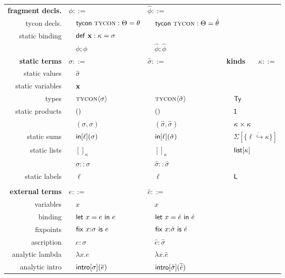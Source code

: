 \documentclass[10pt,preprint]{sigplanconf}
\begin{document}
{\begin{figure*}[t]
\begin{tabular}{r l l l}
\textbf{fragment decls.} & $\phi ::=$ & $\hat\phi ::=$\\
tycon decls. & ~~${\sf tycon}~\textsc{tycon} : \Theta = \theta$ & ~~${\sf tycon}~\textsc{tycon} : \Theta = \hat\theta$\\
static binding & ~~${\sf def}~{\textbf{x}} : \kappa = \sigma$ & \\
 & ~~$\phi; \phi$ & ~~$\hat\phi; \hat\phi$\\
\textbf{static terms} & $\sigma ::=$ & $\hat\sigma ::= $ &\textbf{kinds}~~~  $\kappa ::= $\\
static values & ~~$\hat \sigma$\\
static variables & ~~${\textbf{x}}$ & ~ & ~\\
types & ~~$\textsc{tycon}\langle\sigma\rangle$ & ~~$\textsc{tycon}\langle\hat\sigma\rangle$ & ~~$\textsf{Ty}$\\
static products & ~~$()$ & ~~$()$ & ~~$\textsf{1}$\\
& ~~$(\sigma, \sigma)$ & ~~$(\hat\sigma, \hat\sigma)$ & ~~$\kappa \times \kappa$\\
static sums & ~~${\sf in}[\ell](\sigma)$ & ~~${\sf in}[\ell](\hat\sigma)$ & ~~$\Sigma[\{\overline{\ell \hookrightarrow \kappa}\}]$\\
static lists & ~~$[]_\kappa$ & ~~$[]_\kappa$ & ~~$\textsf{list}[\kappa]$\\
 & ~~$\sigma :: \sigma$ & ~~$\hat\sigma :: \hat\sigma$ & \\
static labels & ~~$\ell$ & ~~$\ell$ & ~~${\sf L}$\\
\\
\textbf{external terms} & $e ::= $ & $\hat e ::=$ \\
variables & ~~$x$ & ~~$x$\\
binding & ~~${\sf let}~x=e~{\sf in}~e$ & ~~${\sf let}~x=\hat{e}~{\sf in}~\hat{e}$\\
fixpoints & ~~${\sf fix}~x{:}\sigma~{\sf is}~e$ & ~~${\sf fix}~x{:}\hat\sigma~{\sf is}~\hat e$\\
ascription & ~~$e : \sigma$ & ~~$\hat{e} : \hat\sigma$\\
analytic lambda & ~~$\lambda x.e$ & ~~$\lambda x.\hat{e}$\\
analytic intro & ~~${\sf intro}[\sigma](\overline{e})$ & ~~${\sf intro}[\hat\sigma](\overline{\hat e})$\\

\end{tabular}
\end{figure*}}
\end{document}

